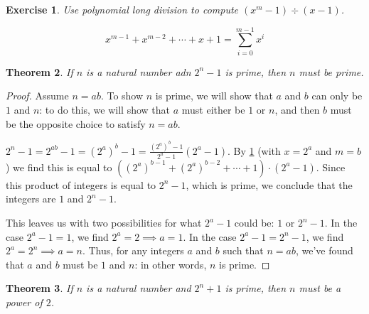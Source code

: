 \documentclass{article}
\newtheorem{thm}{Theorem}[section]
\newtheorem{ex}[thm]{Exercise}
\numberwithin{equation}{thm}
\begin{document}



\begin{ex} \label{2.41}
  Use polynomial long division to compute $(x^m-1) \div (x-1)$.
\end{ex}

$$x^{m-1} + x^{m-2} + \cdots + x + 1 = \sum_{i=0}^{m-1} x^i$$



\begin{thm} \label{2.42}
  If $n$ is a natural number adn $2^n - 1$ is prime, then $n$ must be prime.
\end{thm}

\begin{proof}
  Assume $n = ab$. To show $n$ is prime, we will show that $a$ and $b$ can only be $1$ and $n$: to do this, we will show that $a$ must either be $1$ or $n$, and then $b$ must be the opposite choice to satisfy $n = ab$.

  $2^n - 1 = 2^{ab} - 1 = (2^a)^b - 1 = \frac{(2^a)^b - 1}{2^a - 1} (2^a - 1)$. By \ref{2.41} (with $x = 2^a$ and $m = b$) we find this is equal to $((2^a)^{b-1} + (2^a)^{b-2} + \cdots + 1) \cdot (2^a - 1)$. Since this product of integers is equal to $2^n-1$, which is prime, we conclude that the integers are $1$ and $2^n - 1$.

  This leaves us with two possibilities for what $2^a - 1$ could be: $1$ or $2^n - 1$. In the case $2^a - 1 = 1$, we find $2^a = 2 \implies a = 1$. In the case $2^a - 1 = 2^n - 1$, we find $2^a = 2^n \implies a = n$. Thus, for any integers $a$ and $b$ such that $n = ab$, we've found that $a$ and $b$ must be $1$ and $n$: in other words, $n$ is prime.
\end{proof}



\begin{thm} \label{2.43}
  If $n$ is a natural number and $2^n + 1$ is prime, then $n$ must be a power of $2$.
\end{thm}
\end{document}
